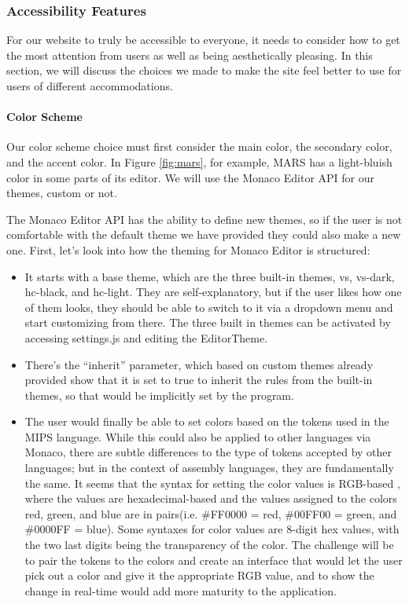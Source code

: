 \documentclass[
    paper=letter,
    parskip=half,
    fontsize=12pt,
    titlepage=firstiscover,
    toc=bibliography,
    numbers=endperiod
]{scrartcl}
\providecommand{\tightlist}{%
  \setlength{\itemsep}{0pt}\setlength{\parskip}{0pt}}
\begin{document}
\subsubsection{Accessibility Features}
\label{subsec:accessibility-features}

For our website to truly be accessible to everyone, it needs to consider
how to get the most attention from users as well as being aesthetically
pleasing. In this section, we will discuss the choices we made to make
the site feel better to use for users of different accommodations.

\paragraph{Color Scheme}

Our color scheme choice must first consider the main color, the
secondary color, and the accent color. In Figure \ref{fig:mars}, for example, MARS
has a light-bluish color in some parts of its editor. We will use the
Monaco Editor API for our themes, custom or not.

The Monaco Editor API has the ability to define new themes, so if the
user is not comfortable with the default theme we have provided they
could also make a new one. First, let's look into how the theming for
Monaco Editor is structured:

\begin{itemize}
    \tightlist
    \item It starts with a base theme, which are the three built-in themes, vs,
    vs-dark, hc-black, and hc-light. They are self-explanatory, but if the
    user likes how one of them looks, they should be able to switch to it
    via a dropdown menu and start customizing from there. The three built
    in themes can be activated by accessing settings.js and editing the
    EditorTheme.
    \item There's the ``inherit'' parameter, which based on custom themes
    already provided \cite{monaco-themes} show that it is set to true to inherit the rules
    from the built-in themes, so that would be implicitly set by the
    program.
    \item The user would finally be able to set colors based on the tokens used
    in the MIPS language. While this could also be applied to other
    languages via Monaco, there are subtle differences to the type of
    tokens accepted by other languages; but in the context of assembly
    languages, they are fundamentally the same. It seems that the syntax
    for setting the color values is RGB-based \cite{rapidtables-rgb}, where the values are
    hexadecimal-based and the values assigned to the colors red, green,
    and blue are in pairs(i.e. \#FF0000 = red, \#00FF00 = green, and
    \#0000FF = blue). Some syntaxes for color values are 8-digit hex
    values, with the two last digits being the transparency of the color.
    The challenge will be to pair the tokens to the colors and create an
    interface that would let the user pick out a color and give it the
    appropriate RGB value, and to show the change in real-time would add
    more maturity to the application.
\end{itemize}
\end{document}
